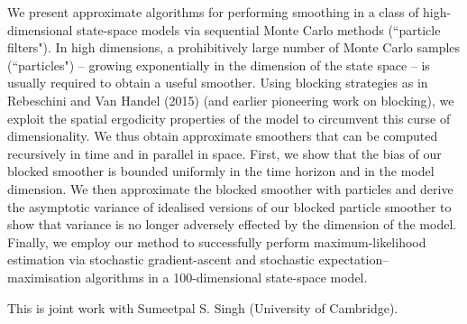 We present approximate algorithms for performing smoothing in a class of high-dimensional state-space models via sequential Monte Carlo methods (``particle filters"). In high dimensions, a prohibitively large number of Monte Carlo samples (``particles") -- growing exponentially in the dimension of the state space -- is usually required to obtain a useful smoother. Using blocking strategies as in Rebeschini and Van Handel (2015) (and earlier pioneering work on blocking), we exploit the spatial ergodicity properties of the model to circumvent this curse of dimensionality. We thus obtain approximate smoothers that can be computed recursively in time and in parallel in space. First, we show that the bias of our blocked smoother is bounded uniformly in the time horizon and in the model dimension. We then approximate the blocked smoother with particles and derive the asymptotic variance of idealised versions of our blocked particle smoother to show that variance is no longer adversely effected by the dimension of the model. Finally, we employ our method to successfully perform maximum-likelihood estimation via stochastic gradient-ascent and stochastic expectation--maximisation algorithms in a 100-dimensional state-space model. 

This is joint work with Sumeetpal S. Singh (University of Cambridge).